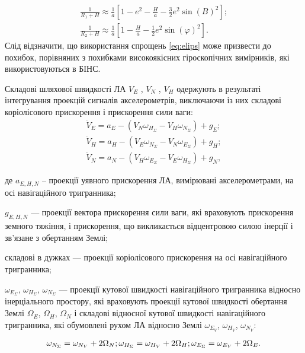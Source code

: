 \begin{equation} 
\label{eq:elips} 
\begin{array}{l} 
{\frac{1}{R_{1} +H} \approx \frac{1}{a}[1-e^{2} -\frac{H}{a} -\frac{3}{2} e^{2} \sin(B)^{2}];} \\ 
{\frac{1}{R_{2} +H} \approx \frac{1}{a}[1-\frac{H}{a} -\frac{1}{2} e^{2} \sin(\varphi)^{2}].} 
\end{array} 
\end{equation} 
Слід відзначити, що використання спрощень \eqref{eq:elips} може призвести 
до похибок, порівняних з похибками високоякісних гіроскопічних вимірників, які використовуються 
в БІНС.

Складові шляхової швидкості ЛА  $V_E$ , $V_N$ , $V_H$  одержують в результаті інтегрування 
проекцій сигналів акселерометрів, виключаючи із них  складові коріолісового прискорення  і 
прискорення сили ваги: 
\begin{equation} 
\label{eq:Vi} 
 \begin{array}{l} 
{\dot{V}_{E} =a_{E} -(V_{N} \omega_{H_{\Sigma } } -V_{H} \omega_{N_{\Sigma} } )+g_{E} ;} \\ 
{\dot{V}_{H} =a_{H} -(V_{E} \omega_{N_{\Sigma } } -V_{N} \omega_{E_{\Sigma} } )+g_{H} ;} \\ 
{\dot{V}_{N} =a_{N} -(V_{H} \omega_{E_{\Sigma } } -V_{E} \omega_{H_{\Sigma} } )+g_{N} ,} 
\end{array}
\end{equation} 
\begin{ESKDexplanation}
\item де $a_{E,H,N} $ -- проекції уявного прискорення ЛА, вимірювані акселерометрами, 
на осі навігаційного тригранника; 
\item $g_{E,H,N} $ --- проекції вектора прискорення 
сили ваги, які враховують прискорення земного тяжіння, і прискорення, що викликається 
відцентровою силою інерції і зв'язане з обертанням Землі; 
\item складові в дужках --- проекції коріолісового прискорення на осі навігаційного тригранника; 
\item $\omega_{E_{\Sigma}}$, $\omega_{H_{\Sigma}}$, $\omega_{N_{\Sigma}}$ --- проекції кутової 
швидкості навігаційного тригранника відносно інерціального простору, які враховують 
проекції кутової швидкості обертання Землі $\Omega_{E}$, $\Omega_{H}$, $\Omega_{N}$ 
і складові відносної кутової швидкості навігаційного тригранника, які обумовлені 
рухом ЛА відносно Землі $\omega_{E_{V} }$, $\omega_{H_{V} }$, $\omega_{N_{V}}$: 
\end{ESKDexplanation}
\[\omega_{N_{\Sigma } } =\omega_{N_{V} } +2\Omega_{N} ;\\ 
\omega_{H_{\Sigma } } =\omega_{H_{V} } +2\Omega_{H} ;\\
\omega_{E_{\Sigma } } =\omega_{E_{V} } +2\Omega_{E} .\] 

